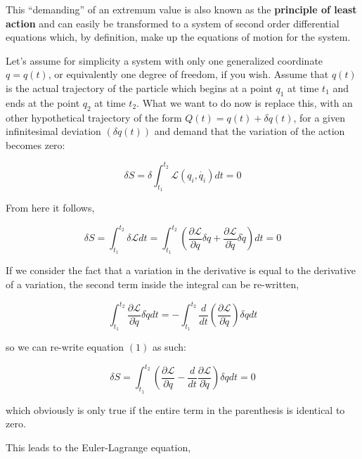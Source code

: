 \documentclass[12pt, a4paper]{article} %
\begin{document}
This “demanding” of an extremum value is also known as the {\bf principle of least action} and can easily be transformed to a system of second order differential equations which, by definition, make up the equations of motion for the system.

Let's assume for simplicity a system with only one generalized coordinate $q=q(t)$, or equivalently one degree of freedom, if you wish. Assume that  $q(t)$ is the actual trajectory of the particle which begins at a point  $q_1$ at time  $t_1$ and ends at the point  $q_2$ at time  $t_2$. What we want to do now is replace this, with an other hypothetical trajectory of the form  $Q(t)=q(t)+\delta q(t)$, for a given infinitesimal deviation $( \delta q(t))$ and demand that the variation of the action becomes zero:

\begin{equation*}
    \delta S = \delta \int_{t_1}^{t_2}\mathscr{L}\left(q_i, \dot{q_i}\right)dt = 0
\end{equation*}

From here it follows,

\begin{equation*}
    \delta S = \int_{t_1}^{t_2}\delta \mathscr{L}dt = \int_{t_1}^{t_2}\left(\frac{\partial \mathscr{L}}{\partial q}\delta q + \frac{\partial \mathscr{L}}{\partial \dot{q}}\delta \dot{q}\right)dt = 0 \tag*{(1)}
\end{equation*}

If we consider the fact that a variation in the derivative is equal to the derivative of a variation, the second term inside the integral can be re-written,

\begin{equation*}
    \int_{t_1}^{t_2}\frac{\partial \mathscr{L}}{\partial \dot{q}}\delta \dot{q}dt = -\int_{t_1}^{t_2}\frac{d}{dt}\left(\frac{\partial \mathscr{L}}{\partial \dot{q}}\right)\delta q dt
\end{equation*}

so we can re-write equation $(1)$ as such:

\begin{equation*}
    \delta S =  \int_{t_1}^{t_2}\left(\frac{\partial \mathscr{L}}{\partial q} - \frac{d}{dt}\frac{\partial \mathscr{L}}{\partial \dot{q}}\right)\delta q dt = 0 \tag*{(2)}
\end{equation*}

which obviously is only true if the entire term in the parenthesis is identical to zero.

This leads to the Euler-Lagrange equation,
\end{document}
